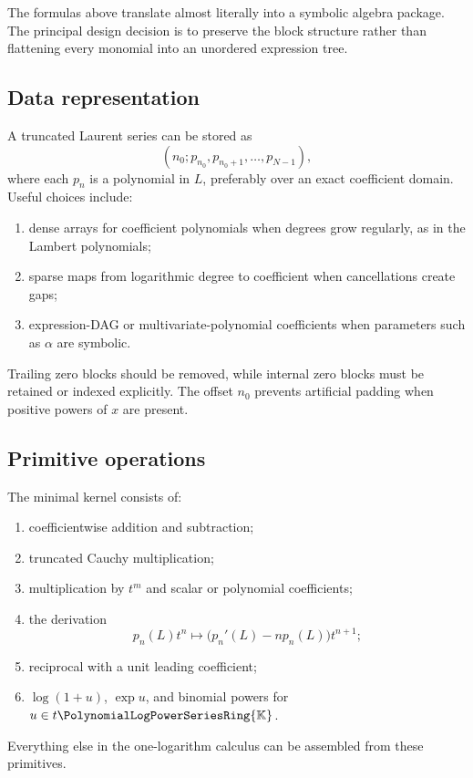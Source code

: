 \documentclass[11pt]{article}
\theoremstyle{pltheorem}
\newcommand{\K}{\mathbb K}
\newcommand{\PL}{\PolynomialLogPowerSeriesRing{\K}}
\begin{document}
The formulas above translate almost literally into a symbolic algebra package.  The principal design decision is to preserve the block structure rather than flattening every monomial into an unordered expression tree.

\subsection{Data representation}

A truncated Laurent series can be stored as
\begin{equation}\label{eq:data-structure}
 (n_0;p_{n_0},p_{n_0+1},\ldots,p_{N-1}),
\end{equation}
where each \(p_n\) is a polynomial in \(L\), preferably over an exact coefficient domain.  Useful choices include:
\begin{enumerate}
\item dense arrays for coefficient polynomials when degrees grow regularly, as in the Lambert polynomials;
\item sparse maps from logarithmic degree to coefficient when cancellations create gaps;
\item expression-DAG or multivariate-polynomial coefficients when parameters such as \(\alpha\) are symbolic.
\end{enumerate}
Trailing zero blocks should be removed, while internal zero blocks must be retained or indexed explicitly.  The offset \(n_0\) prevents artificial padding when positive powers of \(x\) are present.

\subsection{Primitive operations}

The minimal kernel consists of:
\begin{enumerate}
\item coefficientwise addition and subtraction;
\item truncated Cauchy multiplication;
\item multiplication by \(t^m\) and scalar or polynomial coefficients;
\item the derivation
\begin{equation}\label{eq:implementation-D}
 p_n(L)t^n\longmapsto\bigl(p_n'(L)-np_n(L)\bigr)t^{n+1};
\end{equation}
\item reciprocal with a unit leading coefficient;
\item \(\log(1+u)\), \(\exp u\), and binomial powers for \(u\in t\PL\).
\end{enumerate}
Everything else in the one-logarithm calculus can be assembled from these primitives.
\end{document}
